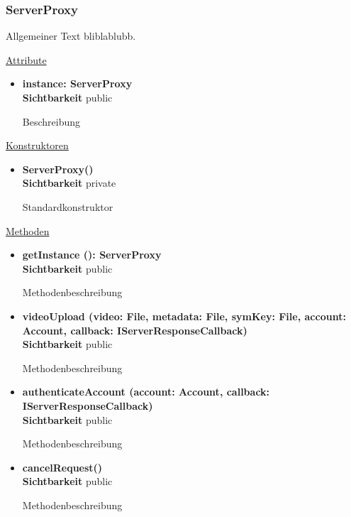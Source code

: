 \subsubsection{ServerProxy}
Allgemeiner Text bliblablubb. \newline

\underline{Attribute}
\begin{itemize}
\itemsep0pt
\item \textbf{instance: ServerProxy} \hfill\\ 
\textbf{Sichtbarkeit} public

Beschreibung

\end{itemize}

\underline{Konstruktoren}
\begin{itemize}
\itemsep0pt
\item \textbf{ServerProxy()} \hfill\\
\textbf{Sichtbarkeit} private

Standardkonstruktor
\end{itemize}

\underline{Methoden}
\begin{itemize}
\itemsep0pt

\item \textbf{getInstance (): ServerProxy}\hfill\\
\textbf{Sichtbarkeit} public

Methodenbeschreibung

\item \textbf{videoUpload (video: File, metadata: File, symKey: File, account: Account, callback: IServerResponseCallback)}\hfill\\
\textbf{Sichtbarkeit} public

Methodenbeschreibung

\item \textbf{authenticateAccount (account: Account, callback: IServerResponseCallback)}\hfill\\
\textbf{Sichtbarkeit} public

Methodenbeschreibung

\item \textbf{cancelRequest()}\hfill\\
\textbf{Sichtbarkeit} public

Methodenbeschreibung

\end{itemize}